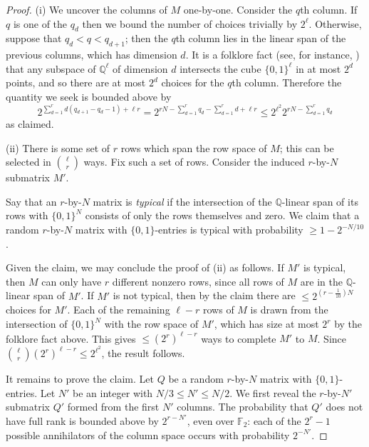 \documentclass[11pt,reqno]{amsart}
\numberwithin{equation}{section}
\theoremstyle{definition}
\theoremstyle{remark}
\newcommand{\mb}{\mathbb}
\renewcommand{\le}{\leqslant}
\renewcommand{\ge}{\geqslant}
\newcommand\Q{\mathbb{Q}}
\begin{document}
\begin{proof}

(i) We uncover the columns of $M$ one-by-one. Consider the $q$th column. If $q$ is one of the $q_d$ then we bound the number of choices trivially by $2^{\ell}$. Otherwise, suppose that $q_d < q < q_{d+1}$; then the $q$th column lies in the linear span of the previous columns, which has dimension $d$. It is a folklore fact (see, for instance, \cite[Lemma 5.1]{FGK23}) that any subspace of $\Q^{\ell}$ of dimension $d$ intersects the cube $\{0,1\}^{\ell}$ in at most $2^d$ points, and so there are at most $2^d$ choices for the $q$th column. Therefore the quantity we seek is bounded above by
\[ 2^{\sum_{d = 1}^r d(q_{d+1} - q_d - 1) + \ell r} = 2^{rN - \sum_{d = 1}^r q_d - \sum_{d = 1}^r d + \ell r} \le 2^{\ell^2} 2^{rN - \sum_{d = 1}^r q_d} \] as claimed.

(ii) There is some set of $r$ rows which span the row space of $M$; this can be selected in $\binom{\ell}{r}$ ways. Fix such a set of rows. Consider the induced $r$-by-$N$ submatrix $M'$.

Say that an $r$-by-$N$ matrix is \emph{typical} if the intersection of the $\Q$-linear span of its rows with $\{0,1\}^N$ consists of only the rows themselves and zero. We claim that a random $r$-by-$N$ matrix with $\{0,1\}$-entries is typical with probability $\ge 1 - 2^{-N/10}$.  

Given the claim, we may conclude the proof of (ii) as follows. If $M'$ is typical, then $M$ can only have $r$ different nonzero rows, since all rows of $M$ are in the $\Q$-linear span of $M'$. If $M'$ is not typical, then by the claim there are $\le 2^{(r - \frac{1}{10}) N}$ choices for $M'$. Each of the remaining $\ell - r$ rows of $M$ is drawn from the intersection of $\{0,1\}^N$ with the row space of $M'$, which has size at most $2^r$ by the folklore fact above. This gives $\le (2^r)^{\ell - r}$ ways to complete $M'$ to $M$. Since $\binom{\ell}{r} (2^r)^{\ell - r} \le 2^{\ell^2}$, the result follows.

It remains to prove the claim. Let $Q$ be a random $r$-by-$N$ matrix with $\{0,1\}$-entries. Let $N'$ be an integer with $N/3 \le N' \le N/2$. We first reveal the $r$-by-$N'$ submatrix $Q'$ formed from the first $N'$ columns. The probability that $Q'$ does not have full rank is bounded above by $2^{r - N'}$, even over $\mb{F}_2$: each of the $2^r - 1$ possible annihilators of the column space occurs with probability $2^{-N'}$.


\end{proof}
\end{document}
